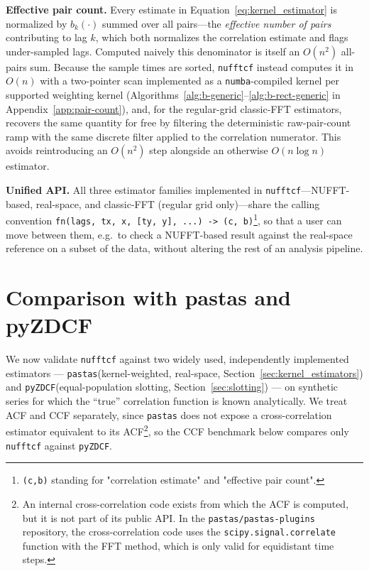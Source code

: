 \documentclass[twocolumn,10pt]{article}
\newcommand{\nufftcf}{\texttt{nufftcf}\xspace}
\newcommand{\pastas}{\texttt{pastas}\xspace}
\newcommand{\pyzdcf}{\texttt{pyZDCF}\xspace}
\begin{document}
\textbf{Effective pair count.} Every estimate in
Equation~\ref{eq:kernel_estimator} is normalized by $b_k(\cdot)$ summed
over all pairs---the \textit{effective number of pairs} contributing to
lag $k$, which both normalizes the correlation estimate and flags
under-sampled lags. Computed naively this denominator is itself an
$O(n^2)$ all-pairs sum. Because the sample times are sorted,
\nufftcf instead computes it in $O(n)$ with a two-pointer scan
implemented as a \texttt{numba}-compiled  \citep{Numba2015} kernel per supported weighting
kernel (Algorithms~\ref{alg:b-generic}--\ref{alg:b-rect-generic} in
Appendix~\ref{app:pair-count}), and, for the regular-grid classic-FFT estimators, recovers the
same quantity for free by filtering the deterministic raw-pair-count
ramp with the same discrete filter applied to the correlation
numerator. This avoids reintroducing an $O(n^2)$ step alongside an
otherwise $O(n\log n)$ estimator.

\textbf{Unified API.} All three estimator families implemented in
\nufftcf---NUFFT-based, real-space, and classic-FFT (regular grid
only)---share the calling convention
\texttt{fn(lags, tx, x, [ty, y], ...) -> (c, b)}\footnote{\texttt{(c,b)} standing for "correlation estimate" and "effective pair count".}, so that a user can move between
them, e.g.\ to check a NUFFT-based result against the real-space
reference on a subset of the data, without altering the rest of an
analysis pipeline.

\section{Comparison with pastas and pyZDCF}
\label{sec:comparison}
We now validate \nufftcf against two widely used, independently
implemented estimators --- \pastas (kernel-weighted, real-space,
Section~\ref{sec:kernel_estimators}) and \pyzdcf (equal-population
slotting, Section~\ref{sec:slotting}) --- on synthetic series for which
the ``true'' correlation function is known analytically. We treat ACF
and CCF separately, since \pastas does not expose a cross-correlation
estimator equivalent to its ACF\footnote{An internal cross-correlation code exists from which the ACF is computed, but it is not part of its public API. In the \texttt{pastas/pastas-plugins} repository, the cross-correlation code uses the \texttt{scipy.signal.correlate} function \citep{scipy2020} with the FFT method, which is only valid for equidistant time steps.}, so the CCF benchmark
below compares only \nufftcf against \pyzdcf.
%
\end{document}
